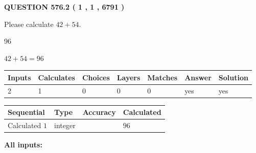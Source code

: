 \documentclass[12pt]{article}
\begin{document}
   
  
\vspace{0.2in}
  
{\textbf{\Large{QUESTION
576.2 
 ( 1 , 1 , 6791 )
}}}
  
  
 
Please calculate $ %
42 +  %
54 $.
 
 
 
\noindent{}
 
 

96
 
 
\noindent{}
 
 

 
 
 
\noindent{}
 
 

$ %
42 +  %
54=   %
96$
 
 
\noindent{}
 
 

 
   
   
   
   
\noindent\begin{tabular}{|l|l|l|l|l|l|l|}
 \hline
Inputs & Calculates & Choices & Layers & Matches & Answer & Solution \\ \hline
 2  & 
 1  & 
 0
  & 
 0  & 
 0  & 
  yes & 
  yes 
  \\ \hline
 \end{tabular}
   
   
   
   
\noindent{}
   
   
  
  
\noindent\begin{tabular}{|l|l|l|l|}
\hline
 Sequential & Type & Accuracy & Calculated \\ 
\hline
 
 
  Calculated $  1 $ & integer &  & 
  $ 96 $ 
 \\  \hline  
 \end{tabular}
   
   
   
   
\noindent\vspace{0.1in}\hspace{-0.08in} {\textbf{\Large{All inputs: }}}
   
\end{document}
